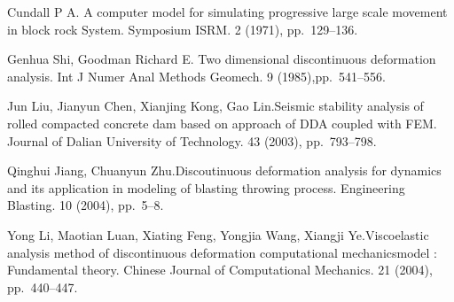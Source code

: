 
\begin{thebibliography}{10}

{\sc Cundall P A}. {A computer model for simulating progressive large scale movement in block rock System}. Symposium ISRM. 2 (1971), pp.~129--136.
	
{\sc Genhua Shi, Goodman Richard E}. {Two dimensional discontinuous deformation analysis}. Int J Numer Anal Methods Geomech. 9 (1985),pp.~541--556.

{\sc Jun Liu, Jianyun Chen, Xianjing Kong, Gao Lin}.{Seismic stability analysis of rolled compacted concrete dam based on approach of DDA coupled with FEM}. Journal of Dalian University of Technology. 43 (2003), pp.~793--798.

{\sc Qinghui Jiang, Chuanyun Zhu}.{Discoutinuous deformation analysis for dynamics and its application in modeling of blasting throwing process}. Engineering Blasting. 10 (2004), pp.~5--8.

{\sc Yong Li, Maotian Luan, Xiating Feng, Yongjia Wang, Xiangji Ye}.{Viscoelastic analysis method of discontinuous deformation computational mechanicsmodel : Fundamental theory}. Chinese Journal of Computational Mechanics. 21 (2004), pp.~440--447.

\end{thebibliography}